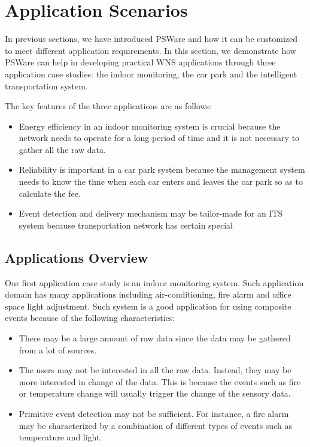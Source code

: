 \section{Application Scenarios}
\label{sec:pswareImpl}
In previous sections, we have introduced PSWare and how it can be customized to meet different application requirements. In this section, we demonstrate how PSWare can help in developing practical WNS applications through three application case studies: the indoor monitoring, the car park and the intelligent transportation system.

The key features of the three applications are as follows:
\begin{itemize}
\item Energy efficiency in an indoor monitoring system is crucial because the network needs to operate for a long period of time and it is not necessary to gather all the raw data.
\item Reliability is important in a car park system because the management system needs to know the time when each car enters and leaves the car park so as to calculate the fee.
\item Event detection and delivery mechanism may be tailor-made for an ITS system because transportation network has certain special 
\end{itemize}


\subsection{Applications Overview}
Our first application case study is an indoor monitoring system. Such application domain has many applications including air-conditioning, fire alarm and office space light adjustment. Such system is a good application for using composite events because of the following characteristics:
\begin{itemize}
\item There may be a large amount of raw data since the data may be gathered from a lot of sources.
\item The users may not be interested in all the raw data. Instead, they may be more interested in change of the data. This is because the events such as fire or temperature change will usually trigger the change of the sensory data. 
\item Primitive event detection may not be sufficient. For instance, a fire alarm may be characterized by a combination of different types of events such as temperature and light.
\end{itemize}

